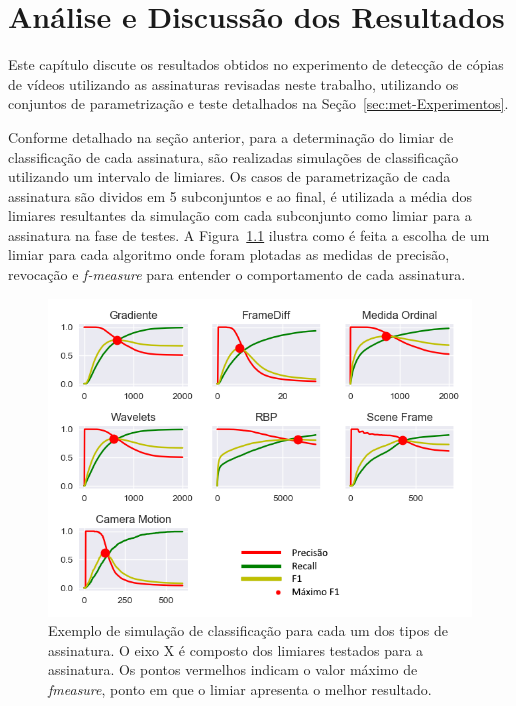 
\chapter{Análise e Discussão dos Resultados}
\label{chap:resultados}

Este capítulo discute os resultados obtidos no experimento de detecção de cópias de vídeos utilizando as assinaturas revisadas neste trabalho, utilizando os conjuntos de parametrização e teste detalhados na Seção~\ref{sec:met-Experimentos}.

Conforme detalhado na seção anterior, para a determinação do limiar de classificação de cada assinatura, são realizadas simulações de classificação utilizando um intervalo de limiares. Os casos de parametrização de cada assinatura são dividos em 5 subconjuntos e ao final, é utilizada a média dos limiares resultantes da simulação com cada subconjunto como limiar para a assinatura na fase de testes. A Figura~\ref{fig:todos-limiares} ilustra como é feita a escolha de um limiar para cada algoritmo onde foram plotadas as medidas de precisão, revocação e \textit{f-measure} para entender o comportamento de cada assinatura.


\begin{figure}[h]
	\centering
	\caption{Exemplo de simulação de classificação para cada um dos tipos de assinatura. O eixo X é composto dos limiares testados para a assinatura. Os pontos vermelhos indicam o valor máximo de \textit{fmeasure}, ponto em que o limiar apresenta o melhor resultado.}
	\label{fig:todos-limiares}
	\includegraphics[width=\textwidth]{dados/figuras/experimentos/todos_final.png}
\end{figure}

